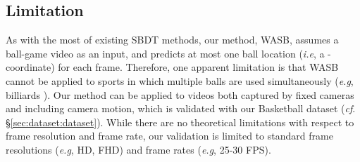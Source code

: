 \documentclass{bmvc2k}
\def\eg{\emph{e.g}\bmvaOneDot}
\def\ie{\emph{i.e}\bmvaOneDot}
\begin{document}
\subsection{Limitation}
\label{sec:eval:limitation}
As with the most of existing SBDT methods, our method, WASB, assumes a ball-game video as an input, and predicts at most one ball location (\ie, a -coordinate) for each frame.
Therefore, one apparent limitation is that WASB cannot be applied to sports in which multiple balls are used simultaneously
(\eg, billiards \cite{rea+2004ivr}).
Our method can be applied to videos both captured by fixed cameras and including camera motion, which is validated with our Basketball dataset ({\it cf}. \S \ref{sec:dataset:dataset}).
While there are no theoretical limitations with respect to frame resolution and frame rate, our validation is limited to standard frame resolutions (\eg, HD, FHD) and frame rates (\eg, 25-30 FPS).
\end{document}
